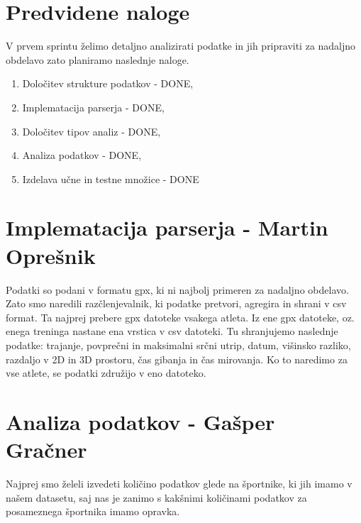 \documentclass[a4paper,11pt]{article}
\begin{document}
\section{Predvidene naloge}
V prvem sprintu želimo detaljno analizirati podatke in jih pripraviti za nadaljno obdelavo zato planiramo naslednje naloge.
	\begin{enumerate}
		\item{Določitev strukture podatkov - \textcolor{OliveGreen}{DONE},}
		\item{Implematacija parserja - \textcolor{OliveGreen}{DONE},}
		\item{Določitev tipov analiz - \textcolor{OliveGreen}{DONE},}
		\item{Analiza podatkov - \textcolor{OliveGreen}{DONE},}
		\item{Izdelava učne in testne množice - \textcolor{OliveGreen}{DONE}}
	\end{enumerate}
\newpage

\section{Implematacija parserja - Martin Oprešnik}
Podatki so podani v formatu gpx, ki ni najbolj primeren za nadaljno obdelavo. Zato smo naredili razčlenjevalnik, ki podatke pretvori, agregira in shrani v csv format. Ta najprej prebere gpx datoteke vsakega atleta. Iz ene gpx datoteke, oz. enega treninga nastane ena vrstica v csv datoteki. Tu shranjujemo naslednje podatke: trajanje, povprečni in maksimalni srčni utrip, datum, višinsko razliko, razdaljo v 2D in 3D prostoru, čas gibanja in čas mirovanja. Ko to naredimo za vse atlete, se podatki združijo v eno datoteko.

\newpage
\section{Analiza podatkov - Gašper Gračner}
Najprej smo želeli izvedeti količino podatkov glede na športnike, ki jih imamo v našem datasetu, saj nas je zanimo s kakšnimi količinami podatkov za posameznega športnika imamo opravka. \\
\end{document}
